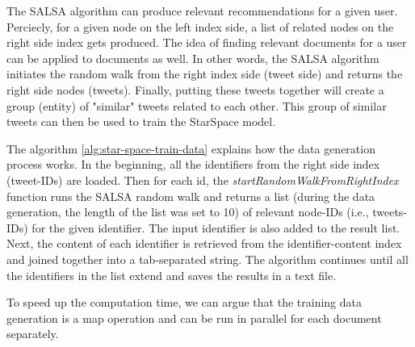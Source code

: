 The SALSA algorithm can produce relevant recommendations for a given user. Perciecly, for a given node on the left index side, a list of related nodes on the right side index gets produced. The idea of finding relevant documents for a user can be applied to documents as well. In other words, the SALSA algorithm initiates the random walk from the right index side (tweet side) and returns the right side nodes (tweets). Finally, putting these tweets together will create a group (entity) of "similar" tweets related to each other. This group of similar tweets can then be used to train the StarSpace model.


The algorithm \ref{alg:star-space-train-data} explains how the data generation process works. In the beginning, all the identifiers from the right side index (tweet-IDs) are loaded. Then for each id, the \emph{startRandomWalkFromRightIndex} function runs the SALSA random walk and returns a list (during the data generation, the length of the list was set to 10) of relevant node-IDs (i.e., tweets-IDs) for the given identifier. The input identifier is also added to the result list. Next, the content of each identifier is retrieved from the identifier-content index and joined together into a tab-separated string. The algorithm continues until all the identifiers in the list extend and saves the results in a text file.


To speed up the computation time, we can argue that the training data generation is a map operation and can be run in parallel for each document separately.


